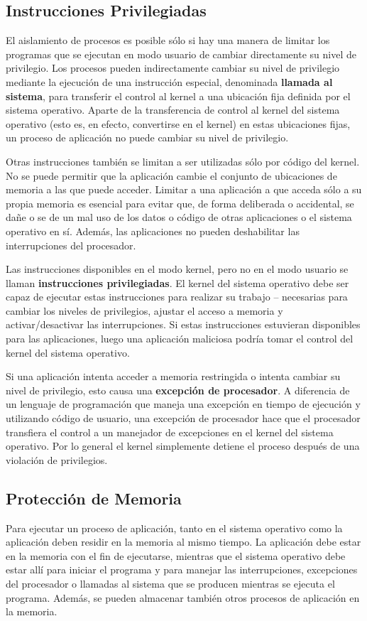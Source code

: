\documentclass[10pt]{book}
\begin{document}
\subsection{Instrucciones Privilegiadas}
El aislamiento de procesos es posible sólo si hay una manera de limitar los programas que se ejecutan en modo usuario de cambiar directamente su nivel de privilegio. Los procesos pueden indirectamente cambiar su nivel de privilegio mediante la ejecución de una instrucción especial, denominada \textbf{llamada al sistema}, para transferir el control al kernel a una ubicación fija definida por el sistema operativo. Aparte de la transferencia de control al kernel del sistema operativo (esto es, en efecto, convertirse en el kernel) en estas ubicaciones fijas, un proceso de aplicación no puede cambiar su nivel de privilegio.

Otras instrucciones también se limitan a ser utilizadas sólo por código del kernel. No se puede permitir que la aplicación cambie el conjunto de ubicaciones de memoria a las que puede acceder. Limitar a una aplicación a que acceda sólo a su propia memoria es esencial para evitar que, de forma deliberada o accidental, se dañe o se de un mal uso de los datos o código de otras aplicaciones o el sistema operativo en sí. Además, las aplicaciones no pueden deshabilitar las interrupciones del procesador.

Las instrucciones disponibles en el modo kernel, pero no en el modo usuario se llaman \textbf{instrucciones privilegiadas}. El kernel del sistema operativo debe ser capaz de ejecutar estas instrucciones para realizar su trabajo -- necesarias para cambiar los niveles de privilegios, ajustar el acceso a memoria y activar/desactivar las interrupciones. Si estas instrucciones estuvieran disponibles para las aplicaciones, luego una aplicación maliciosa podría tomar el control del kernel del sistema operativo.

Si una aplicación intenta acceder a memoria restringida o intenta cambiar su nivel de privilegio, esto causa una \textbf{excepción de procesador}. A diferencia de un lenguaje de programación que maneja una excepción en tiempo de ejecución y utilizando código de usuario, una excepción de procesador hace que el procesador transfiera el control a un manejador de excepciones en el kernel del sistema operativo. Por lo general el kernel simplemente detiene el proceso después de una violación de privilegios.


\subsection{Protección de Memoria}
Para ejecutar un proceso de aplicación, tanto en el sistema operativo como la aplicación deben residir en la memoria al mismo tiempo. La aplicación debe estar en la memoria con el fin de ejecutarse, mientras que el sistema operativo debe estar allí para iniciar el programa y para manejar las interrupciones, excepciones del procesador o llamadas al sistema que se producen mientras se ejecuta el programa. Además, se pueden almacenar también otros procesos de aplicación en la memoria.
\end{document}
